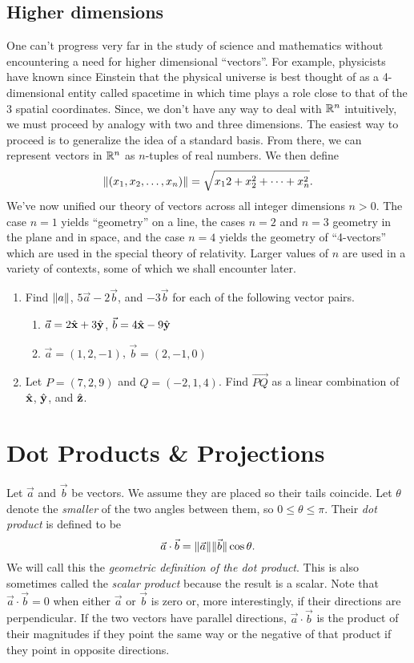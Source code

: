 \subsection{Higher dimensions}
One can't progress very far in the study of science and mathematics
without encountering a need for higher dimensional ``vectors''.  For
example, physicists have known since Einstein that the physical
universe is best thought of as a 4-dimensional entity called
spacetime in which time plays a role close to that of the 
3 spatial coordinates.  Since, we don't have any way to deal with
$\mathbb{R}^n$
intuitively, we must
proceed by analogy with two and three dimensions.
The easiest
way to proceed is to generalize the idea of a standard basis.
From there, we can represent vectors in $\mathbb{R}^n$ as $n$-tuples of real numbers.
We then define
\[
	\lVert(x_1,x_2,\ldots,x_n)\rVert = \sqrt{x_12+x_2^2+\cdots+x_n^2}.	
\]
We've now unified our theory of vectors across all integer dimensions $n>0$.
The case $n=1$ yields  ``geometry'' on a line, 
the cases $n = 2$ and $n = 3$ geometry in the plane and in space, and
the case $n = 4$ yields the geometry of ``4-vectors'' which
are  used in the special theory of relativity.
Larger values of $n$ are used in a
variety of contexts, some of which we shall encounter later.


\begin{exercises}
	\begin{enumerate}
		\item Find $\lVert a\rVert$, $5\vec a-2\vec b$, and $-3\vec b$ for each of
			the following vector pairs.
			\begin{enumerate}
				\item $\vec a=2{\hat {\mathbf x}}+3{\hat {\mathbf y}}$, $\vec b=4{\hat {\mathbf x}}-9{\hat {\mathbf y}}$
				\item $\vec a=(1,2,-1)$, $\vec b=(2,-1,0)$
			\end{enumerate}
		\item Let $P=(7,2,9)$ and $Q=(-2,1,4)$.  Find $\overrightarrow{PQ}$
			as a linear combination of ${\hat {\mathbf x}}$, ${\hat {\mathbf y}}$, and ${\hat {\mathbf z}}$.
	\end{enumerate}
\end{exercises}


\section{Dot Products \& Projections}
Let $\vec a$ and $\vec b$ be vectors.  We assume they are placed so their
tails coincide.  Let $\theta$ denote the \emph{smaller} of the
two angles between them, so $0\le \theta \le \pi$.
Their \emph{dot product} is defined to be
\[
	\vec a\cdot \vec b=\lVert\vec a\rVert\lVert\vec b\rVert\cos \theta.
\]
We will call this the \emph{geometric definition of the dot product}.
This is also sometimes called the \emph{scalar product} because
the result is a scalar.
Note that $\vec a\cdot\vec b = 0$ when either $\vec a$ or $\vec b$ is zero or,
more interestingly, if their directions are perpendicular.
If the two vectors have parallel directions, $\vec a\cdot\vec b$ is
the product of their magnitudes if they point the same way
or the negative of that product if they point in opposite
directions.

